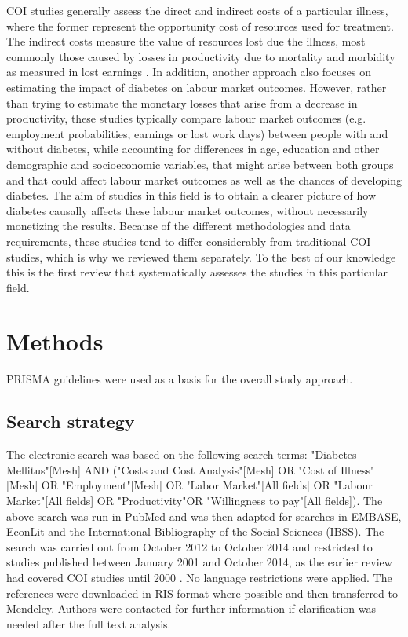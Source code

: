 \ac{COI} studies generally assess the direct and indirect costs of a particular illness, where the former represent the opportunity cost of resources used for treatment. The indirect costs measure the value of resources lost due the illness, most commonly those caused by losses in productivity due to mortality and morbidity as measured in lost earnings \parencite{Segel2006}. In addition, another approach also focuses on estimating the impact of diabetes on labour market outcomes. However, rather than trying to estimate the monetary losses that arise from a decrease in productivity, these studies typically compare labour market outcomes (e.g. employment probabilities, earnings or lost work days) between people with and without diabetes, while accounting for differences in age, education and other demographic and socioeconomic variables, that might arise between both groups and that could affect labour market outcomes as well as the chances of developing diabetes. The aim of studies in this field is to obtain a clearer picture of how diabetes causally affects these labour market outcomes, without necessarily monetizing the results. Because of the different methodologies and data requirements, these studies tend to differ considerably from traditional \ac{COI} studies, which is why we reviewed them separately. To the best of our knowledge this is the first review that systematically assesses the studies in this particular field.

\section{Methods}

\ac{PRISMA} guidelines were used as a basis for the overall study approach.\parencite{Moher2009b}
\subsection{Search strategy}
The electronic search was based on the following search terms: "Diabetes Mellitus"[Mesh] AND ("Costs and Cost Analysis"[Mesh] OR "Cost of Illness"[Mesh] OR "Employment"[Mesh] OR "Labor Market"[All fields] OR "Labour Market"[All fields] OR "Productivity"OR "Willingness to pay"[All fields]). The above search was run in PubMed and was then adapted for searches in EMBASE, EconLit and the International Bibliography of the Social Sciences (IBSS). The search was carried out from October 2012 to October 2014 and restricted to studies published between January 2001 and October 2014, as the earlier review had covered \ac{COI} studies until 2000 \parencite{Ettaro2004}. No language restrictions were applied. The references were downloaded in RIS format where possible and then transferred to Mendeley. Authors were contacted for further information if clarification was needed after the full text analysis.

